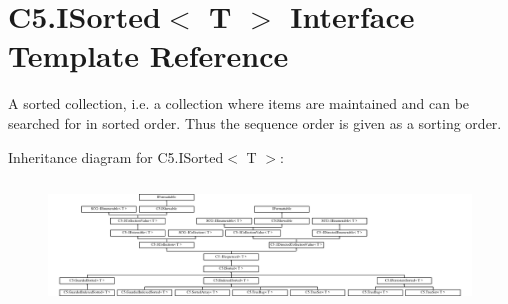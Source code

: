 \hypertarget{interface_c5_1_1_i_sorted}{}\section{C5.\+I\+Sorted$<$ T $>$ Interface Template Reference}
\label{interface_c5_1_1_i_sorted}


A sorted collection, i.\+e. a collection where items are maintained and can be searched for in sorted order. Thus the sequence order is given as a sorting order.  


Inheritance diagram for C5.\+I\+Sorted$<$ T $>$\+:\begin{figure}[H]
\begin{center}
\leavevmode
\includegraphics[height=3.380281cm]{interface_c5_1_1_i_sorted}
\end{center}
\end{figure}
